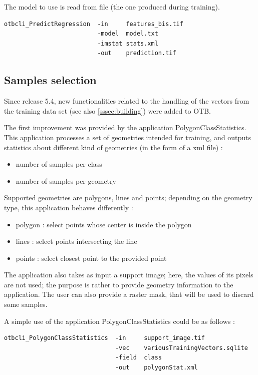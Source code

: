 The model to use is read from file (the one produced during training).

\begin{verbatim}
otbcli_PredictRegression  -in     features_bis.tif
                          -model  model.txt
                          -imstat stats.xml
                          -out    prediction.tif
\end{verbatim}



\subsection{Samples selection}\label{ssec:samplesselect}

Since release 5.4, new functionalities related to the handling of the vectors from the training data set (see also \ref{sssec:building}) were added to OTB.

The first improvement was provided by the application PolygonClassStatistics. This application processes a set of geometries intended for training, 
and outputs statistics about different kind of geometries (in the form of a xml file) :
\begin{itemize}
\item number of samples per class
\item number of samples per geometry
\end{itemize}

Supported geometries are polygons, lines and points; depending on the geometry type, this application behaves differently : 
\begin{itemize}
\item polygon : select points whose center is inside the polygon
\item lines : select points intersecting the line
\item points : select closest point to the provided point
\end{itemize}
The application also takes as input a support image; here, the values of its pixels are not used; 
the purpose is rather to provide geometry information to the application. 
The user can also provide a raster mask, that will be used to discard some samples.

A simple use of the application PolygonClassStatistics could be as follows :
\begin{verbatim}
otbcli_PolygonClassStatistics  -in     support_image.tif
                               -vec    variousTrainingVectors.sqlite
                               -field  class
                               -out    polygonStat.xml
\end{verbatim}

